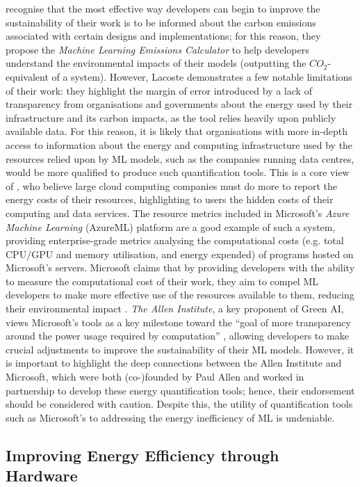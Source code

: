 \documentclass[a4paper, 12pt]{article}
\begin{document}
     recognise that the most effective way developers can begin to improve the sustainability of their work is to be informed about the carbon emissions associated with certain designs and implementations; for this reason, they propose the \emph{Machine Learning Emissions Calculator} to help developers understand the environmental impacts of their models (outputting the $CO_2$-equivalent of a system). However, Lacoste demonstrates a few notable limitations of their work: they highlight the margin of error introduced by a lack of transparency from organisations and governments about the energy used by their infrastructure and its carbon impacts, as the tool relies heavily upon publicly available data. For this reason, it is likely that organisations with more in-depth access to information about the energy and computing infrastructure used by the resources relied upon by ML models, such as the companies running data centres, would be more qualified to produce such quantification tools. This is a core view of , who believe large cloud computing companies must do more to report the energy costs of their resources, highlighting to users the hidden costs of their computing and data services. The resource metrics included in Microsoft's \emph{Azure Machine Learning} (AzureML) platform are a good example of such a system, providing enterprise-grade metrics analysing the computational costs (e.g. total CPU/GPU and memory utilisation, and energy expended) of programs hosted on Microsoft's servers. Microsoft claims that by providing developers with the ability to measure the computational cost of their work, they aim to compel ML developers to make more effective use of the resources available to them, reducing their environmental impact \cite{buchanan-2021}. \emph{The Allen Institute}, a key proponent of Green AI, views Microsoft's tools as a key milestone toward the ``goal of more transparency around the power usage required by computation” \cite{dodge-2019}, allowing developers to make crucial adjustments to improve the sustainability of their ML models. However, it is important to highlight the deep connections between the Allen Institute and Microsoft, which were both (co-)founded by Paul Allen and worked in partnership to develop these energy quantification tools; hence, their endorsement should be considered with caution. Despite this, the utility of quantification tools such as Microsoft's to addressing the energy inefficiency of ML is undeniable.


    \subsection{Improving Energy Efficiency through Hardware}
\end{document}
